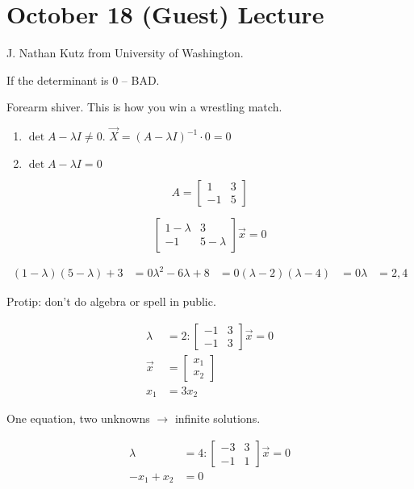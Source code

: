 \section{October 18 (Guest) Lecture}

J. Nathan Kutz from University of Washington.

If the determinant is 0 -- BAD.

Forearm shiver. This is how you win a wrestling match.

\begin{enumerate}
  \item $\det{A - \lambda I} \not= 0$. $\vec{X} = (A - \lambda I)^{-1} \cdot 0 = 0$
  \item $\det{A - \lambda I} = 0$
\end{enumerate}

\[
  A = \begin{bmatrix}
    1 & 3 \\ -1 & 5
  \end{bmatrix}
\]  

\[
  \begin{bmatrix}
    1 - \lambda & 3 \\ -1 & 5 - \lambda
  \end{bmatrix} \vec{x} = 0
\]

\begin{align*}
  (1 - \lambda)(5 - \lambda) + 3 &= 0
  \lambda^2 - 6 \lambda + 8 &= 0
  (\lambda - 2)(\lambda - 4) &= 0
  \lambda &= 2,4
\end{align*}

Protip: don't do algebra or spell in public.

\begin{align*}
  \lambda &= 2: \begin{bmatrix}
    -1 & 3 \\ -1 & 3
  \end{bmatrix} \vec{x} = 0\\
  \vec{x} &= \begin{bmatrix}
    x_1 \\ x_2
  \end{bmatrix} \\
  x_1 &= 3x_2
\end{align*}

One equation, two unknowns $\to$ infinite solutions.

\begin{align*}
  \lambda &= 4: \begin{bmatrix}
    -3 & 3 \\ -1 & 1
  \end{bmatrix} \vec{x} = 0\\
  -x_1 + x_2 &= 0
\end{align*}

